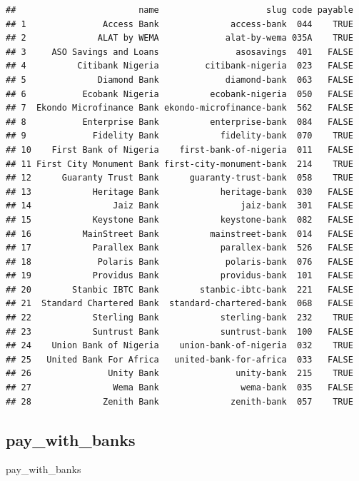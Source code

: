 \documentclass[]{book}
\newenvironment{Shaded}{\begin{snugshade}}{\end{snugshade}}
\newcommand{\NormalTok}[1]{#1}
\begin{document}
\begin{verbatim}
##                        name                     slug code payable
## 1               Access Bank              access-bank  044    TRUE
## 2              ALAT by WEMA             alat-by-wema 035A    TRUE
## 3     ASO Savings and Loans               asosavings  401   FALSE
## 4          Citibank Nigeria         citibank-nigeria  023   FALSE
## 5              Diamond Bank             diamond-bank  063   FALSE
## 6           Ecobank Nigeria          ecobank-nigeria  050   FALSE
## 7  Ekondo Microfinance Bank ekondo-microfinance-bank  562   FALSE
## 8           Enterprise Bank          enterprise-bank  084   FALSE
## 9             Fidelity Bank            fidelity-bank  070    TRUE
## 10    First Bank of Nigeria    first-bank-of-nigeria  011   FALSE
## 11 First City Monument Bank first-city-monument-bank  214    TRUE
## 12      Guaranty Trust Bank      guaranty-trust-bank  058    TRUE
## 13            Heritage Bank            heritage-bank  030   FALSE
## 14                Jaiz Bank                jaiz-bank  301   FALSE
## 15            Keystone Bank            keystone-bank  082   FALSE
## 16          MainStreet Bank          mainstreet-bank  014   FALSE
## 17            Parallex Bank            parallex-bank  526   FALSE
## 18             Polaris Bank             polaris-bank  076   FALSE
## 19            Providus Bank            providus-bank  101   FALSE
## 20        Stanbic IBTC Bank        stanbic-ibtc-bank  221   FALSE
## 21  Standard Chartered Bank  standard-chartered-bank  068   FALSE
## 22            Sterling Bank            sterling-bank  232    TRUE
## 23            Suntrust Bank            suntrust-bank  100   FALSE
## 24    Union Bank of Nigeria    union-bank-of-nigeria  032    TRUE
## 25   United Bank For Africa   united-bank-for-africa  033   FALSE
## 26               Unity Bank               unity-bank  215    TRUE
## 27                Wema Bank                wema-bank  035   FALSE
## 28              Zenith Bank              zenith-bank  057    TRUE
\end{verbatim}

\subsection{pay\_with\_banks}\label{pay_with_banks}

\begin{Shaded}
\begin{Highlighting}[]
\NormalTok{pay_with_banks}
\end{Highlighting}
\end{Shaded}
\end{document}
